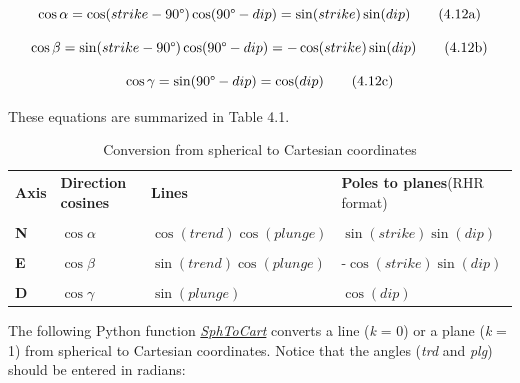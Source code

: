 \documentclass[a4paper , 12pt]{book}
\begin{document}
\begin{equation}
    \cos\alpha=\cos(strike-90\degree)\cos(90\degree-dip)=\sin(strike)\sin(dip) \tag{4.12a}
\end{equation}

\begin{equation}
     \cos\beta=\sin(strike-90\degree)\cos(90\degree-dip)=-\cos(strike)\sin(dip) \tag{4.12b}
\end{equation}

\begin{equation}
    \cos\gamma=\sin(90\degree-dip)=\cos(dip) \tag{4.12c}
\end{equation}

These equations are summarized in Table 4.1.

\begin{table}[h!]
\small
\centering
\begin{tabular}{p{1.5cm} p{2cm} p{4cm} p{3.5cm}} 
 \hline\hline
 \textbf{Axis} & \textbf{Direction cosines} & \textbf{Lines} & \textbf{Poles to planes}\newline (RHR format) \\ \\
 \hline
 \textbf{N} & $\cos\alpha$ & $\cos(trend)\cos(plunge)$ & $\sin(strike)\sin(dip)$ \\ \\
 \textbf{E} & $\cos\beta$ & $\sin(trend)\cos(plunge)$ & -$\cos(strike)\sin(dip)$ \\ \\
 \textbf{D} & $\cos\gamma$ & $\sin(plunge)$ & $\cos(dip)$ \\
 \hline\hline
\end{tabular}
\caption{Conversion from spherical to Cartesian coordinates}
\label{table4.1}
\end{table}

The following Python function \href{http://github.com}{\textit{SphToCart}} converts a line (\textit{k} = 0) or a plane (\textit{k} = 1) from spherical to Cartesian coordinates. Notice that the angles (\textit{trd} and \textit{plg}) should be entered in radians:
\end{document}
